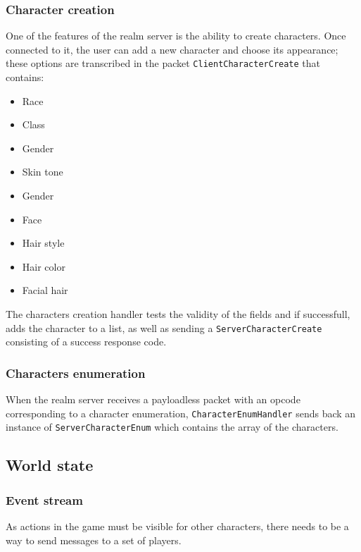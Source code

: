 \documentclass[paper=a4, fontsize=11pt]{scrartcl}
\begin{document}
\subsubsection{Character creation}

One of the features of the realm server is the ability to create characters.
Once connected to it, the user can add a new character and choose its appearance; 
these options are transcribed in the packet \texttt{ClientCharacterCreate} that
contains:
\begin{multicols}{2}
\begin{itemize}
    \item Race
    \item Class
    \item Gender
    \item Skin tone
    \item Gender
    \item Face
    \item Hair style
    \item Hair color
    \item Facial hair
\end{itemize}
\end{multicols}

The characters creation handler tests the validity of the fields and if successfull,
adds the character to a list, as well as sending a \texttt{ServerCharacterCreate}
consisting of a success response code.

\subsubsection{Characters enumeration}

When the realm server receives a payloadless packet with an opcode corresponding
to a character enumeration, \texttt{CharacterEnumHandler} sends back an instance
of \texttt{ServerCharacterEnum} which contains the array of the characters.

\subsection{World state}

\subsubsection{Event stream}

As actions in the game must be visible for other characters, there needs to
be a way to send messages to a set of players.
\end{document}
